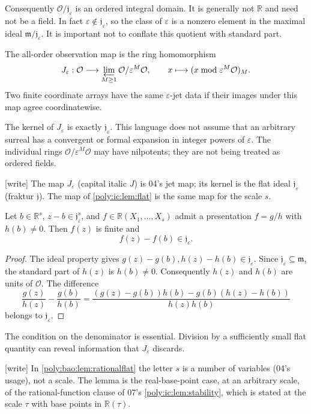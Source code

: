 \documentclass[11pt,a4paper]{article}
\numberwithin{equation}{section}
\theoremstyle{plain}
\newcommand{\wtag}{\textup{[write]}}%
\newcommand{\R}{\mathbb R}
\newcommand{\eps}{\varepsilon}
\newcommand{\OO}{\mathcal O}
\newcommand{\mm}{\mathfrak m}
\newcommand{\JJ}{\mathfrak j}
\begin{document}
Consequently $\OO/\JJ_\eps$ is an ordered integral domain. It is generally not
$\R$ and need not be a field. In fact $\eps\notin\JJ_\eps$, so the class of
$\eps$ is a nonzero element in the maximal ideal $\mm/\JJ_\eps$.
It is important not to conflate this quotient with standard part.

\begin{definition}
The all-order observation map is the ring homomorphism
\begin{equation}\label{poly:bao:eq:jets}
 J_\eps:\OO\longrightarrow\varprojlim_{M\geq1}\OO/\eps^M\OO,
 \qquad x\longmapsto(x\bmod\eps^M\OO)_M.
\end{equation}
Two finite coordinate arrays have the same $\eps$-jet data if their images
under this map agree coordinatewise.
\end{definition}
The kernel of $J_\eps$ is exactly $\JJ_\eps$. This language does not assume that
an arbitrary surreal has a convergent or formal expansion in integer
powers of $\eps$. The individual rings $\OO/\eps^M\OO$ may have
nilpotents; they are not being treated as ordered fields.

\wtag{} The map $J_\eps$ (capital italic $J$) is 04's jet map; its kernel is
the flat ideal $\JJ_\eps$ (fraktur $\mathfrak j$). The map of
\cref{poly:ic:lem:flat} is the same map for the scale $s$.

\begin{lemma}\label{poly:bao:lem:rationalflat}
Let $b\in\R^s$, $z-b\in\JJ_\eps^s$, and $f\in\R(X_1,\ldots,X_s)$ admit
a presentation $f=g/h$ with $h(b)\neq0$. Then $f(z)$ is finite and
\[
 f(z)-f(b)\in\JJ_\eps.
\]
\end{lemma}
\begin{proof}
The ideal property gives $g(z)-g(b),h(z)-h(b)\in\JJ_\eps$. Since
$\JJ_\eps\subseteq\mm$, the standard part of $h(z)$ is $h(b)\neq0$.
Consequently $h(z)$ and $h(b)$ are units of $\OO$. The difference
\[
 \frac{g(z)}{h(z)}-\frac{g(b)}{h(b)}
 =\frac{(g(z)-g(b))h(b)-g(b)(h(z)-h(b))}{h(z)h(b)}
\]
belongs to $\JJ_\eps$.
\end{proof}
The condition on the denominator is essential. Division by a sufficiently
small flat quantity can reveal information that $J_\eps$ discards.

\wtag{} In \cref{poly:bao:lem:rationalflat} the letter $s$ is a number of
variables (04's usage), not a scale. The lemma is the real-base-point case,
at an arbitrary scale, of the rational-function clause of 07's
\cref{poly:ic:lem:stability}, which is stated at the scale $\tau$ with base
points in $\R(\tau)$.
\end{document}

